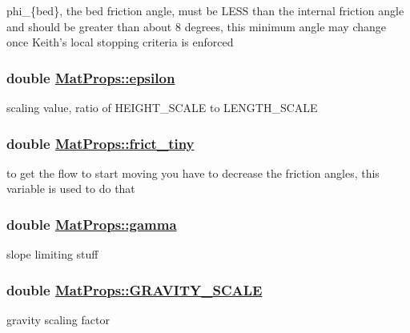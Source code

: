 phi\_\-\{bed\}, the bed friction angle, must be LESS than the internal friction angle and should be greater than about 8 degrees, this minimum angle may change once Keith's local stopping criteria is enforced 

\hypertarget{structMatProps_o11}{
\subsubsection[epsilon]{\setlength{\rightskip}{0pt plus 5cm}double \hyperlink{structMatProps_o11}{Mat\-Props::epsilon}}}
\label{structMatProps_o11}


scaling value, ratio of HEIGHT\_\-SCALE to LENGTH\_\-SCALE 

\hypertarget{structMatProps_o18}{
\subsubsection[frict\_\-tiny]{\setlength{\rightskip}{0pt plus 5cm}double \hyperlink{structMatProps_o18}{Mat\-Props::frict\_\-tiny}}}
\label{structMatProps_o18}


to get the flow to start moving you have to decrease the friction angles, this variable is used to do that 

\hypertarget{structMatProps_o12}{
\subsubsection[gamma]{\setlength{\rightskip}{0pt plus 5cm}double \hyperlink{structMatProps_o12}{Mat\-Props::gamma}}}
\label{structMatProps_o12}


slope limiting stuff 

\hypertarget{structMatProps_o15}{
\subsubsection[GRAVITY\_\-SCALE]{\setlength{\rightskip}{0pt plus 5cm}double \hyperlink{structMatProps_o15}{Mat\-Props::GRAVITY\_\-SCALE}}}
\label{structMatProps_o15}


gravity scaling factor 

